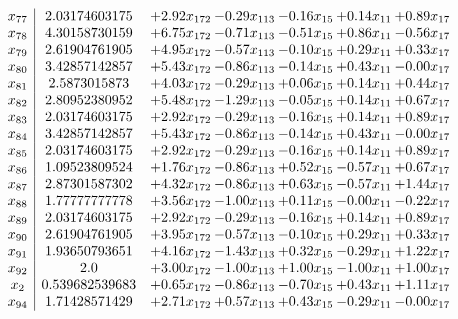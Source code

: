 \documentclass[8pt]{article}
\begin{document}
\[\begin{array}{c| c c@{\hskip 2pt} c@{\hskip 2pt} c@{\hskip 2pt} c@{\hskip 2pt} c@{\hskip 2pt} }
 x_{77}   &  2.03174603175 & +  2.92 x_{172} & -0.29 x_{113} & -0.16 x_{15} & +  0.14 x_{11} & +  0.89 x_{17}\\
 x_{78}   &  4.30158730159 & +  6.75 x_{172} & -0.71 x_{113} & -0.51 x_{15} & +  0.86 x_{11} & -0.56 x_{17}\\
 x_{79}   &  2.61904761905 & +  4.95 x_{172} & -0.57 x_{113} & -0.10 x_{15} & +  0.29 x_{11} & +  0.33 x_{17}\\
 x_{80}   &  3.42857142857 & +  5.43 x_{172} & -0.86 x_{113} & -0.14 x_{15} & +  0.43 x_{11} & -0.00 x_{17}\\
 x_{81}   &  2.5873015873 & +  4.03 x_{172} & -0.29 x_{113} & +  0.06 x_{15} & +  0.14 x_{11} & +  0.44 x_{17}\\
 x_{82}   &  2.80952380952 & +  5.48 x_{172} & -1.29 x_{113} & -0.05 x_{15} & +  0.14 x_{11} & +  0.67 x_{17}\\
 x_{83}   &  2.03174603175 & +  2.92 x_{172} & -0.29 x_{113} & -0.16 x_{15} & +  0.14 x_{11} & +  0.89 x_{17}\\
 x_{84}   &  3.42857142857 & +  5.43 x_{172} & -0.86 x_{113} & -0.14 x_{15} & +  0.43 x_{11} & -0.00 x_{17}\\
 x_{85}   &  2.03174603175 & +  2.92 x_{172} & -0.29 x_{113} & -0.16 x_{15} & +  0.14 x_{11} & +  0.89 x_{17}\\
 x_{86}   &  1.09523809524 & +  1.76 x_{172} & -0.86 x_{113} & +  0.52 x_{15} & -0.57 x_{11} & +  0.67 x_{17}\\
 x_{87}   &  2.87301587302 & +  4.32 x_{172} & -0.86 x_{113} & +  0.63 x_{15} & -0.57 x_{11} & +  1.44 x_{17}\\
 x_{88}   &  1.77777777778 & +  3.56 x_{172} & -1.00 x_{113} & +  0.11 x_{15} & -0.00 x_{11} & -0.22 x_{17}\\
 x_{89}   &  2.03174603175 & +  2.92 x_{172} & -0.29 x_{113} & -0.16 x_{15} & +  0.14 x_{11} & +  0.89 x_{17}\\
 x_{90}   &  2.61904761905 & +  3.95 x_{172} & -0.57 x_{113} & -0.10 x_{15} & +  0.29 x_{11} & +  0.33 x_{17}\\
 x_{91}   &  1.93650793651 & +  4.16 x_{172} & -1.43 x_{113} & +  0.32 x_{15} & -0.29 x_{11} & +  1.22 x_{17}\\
 x_{92}   &  2.0 & +  3.00 x_{172} & -1.00 x_{113} & +  1.00 x_{15} & -1.00 x_{11} & +  1.00 x_{17}\\
 x_{2}   &  0.539682539683 & +  0.65 x_{172} & -0.86 x_{113} & -0.70 x_{15} & +  0.43 x_{11} & +  1.11 x_{17}\\
 x_{94}   &  1.71428571429 & +  2.71 x_{172} & +  0.57 x_{113} & +  0.43 x_{15} & -0.29 x_{11} & -0.00 x_{17}\\

\end{array}\]
\end{document}
